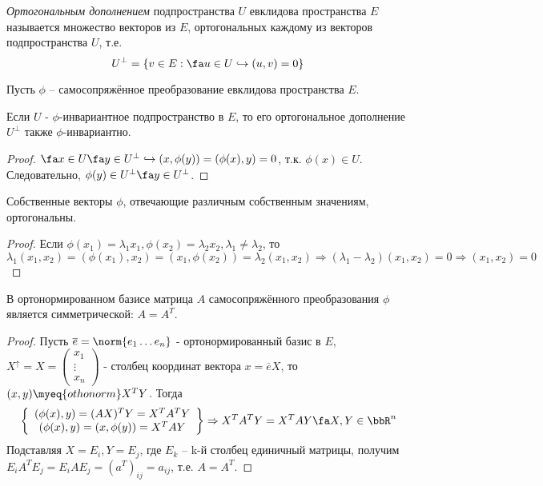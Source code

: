   \begin{defn}
  \textit{Ортогональным дополнением} подпространства $U$ евклидова пространства $E$ называется множество векторов из $E$, ортогональных каждому из векторов подпространства $U$, т.е.
  \begin{equation}\label{23.1.orthogonal}
  U^\perp=\{v \in E: \fa u \in U \hookrightarrow (u,v)=0\}
  \end{equation}
  \end{defn}
  
  Пусть $\phi$ -- самосопряжённое преобразование евклидова \linebreak пространства $E$.
  \begin{stt}\label{23.1.stt_orth}
  Если $U$ - $\phi$-инвариантное подпространство в $E$, то его ортогональное дополнение $U^\perp$ также $\phi$-инвариантно.
  \end{stt}
  \begin{proof}
  $\fa x \in U \fa y \in U^\perp \hookrightarrow (x,\phi(y))=(\phi(x),y)=0$, т.к. $\phi(x)\in U$. Следовательно, $\phi(y)\in U^\perp \fa y\in U^\perp$.
  \end{proof}
  
  \begin{stt}
  Собственные векторы $\phi$, отвечающие различным собственным значениям, ортогональны.
  \end{stt}
  \begin{proof}
  Если $\phi(x_1)=\lambda_1 x_1, \phi(x_2)=\lambda_2 x_2, \lambda_1 \neq \lambda_2$, то $\lambda_1(x_1,x_2)=(\phi(x_1),x_2)=(x_1,\phi(x_2))=\lambda_2(x_1,x_2) \Rightarrow (\lambda_1-\lambda_2)(x_1,x_2)=0 \Rightarrow (x_1,x_2)=0$
  \end{proof}    
  
  \begin{stt}
  В ортонормированном базисе матрица $A$ самосопряжённого преобразования $\phi$ является симметрической: $A=A^T$.
  \end{stt}
  \begin{proof}
  Пусть $\overline{e}=\norm{e_1 \ldots e_n}$ - ортонормированный базис в $E$, $X^\uparrow=X=
  \begin{pmatrix}
  x_1 \\ \vdots \\ x_n
  \end{pmatrix}$ - столбец координат вектора $x=\overline{e}X$, то $(x,y)\myeq{othonorm}X^TY$. Тогда
  \begin{equation*}
  \left\lbrace \begin{array}{crl}
    (\phi(x),y)=(AX)^TY=X^TA^TY \\
    (\phi(x),y)=(x,\phi(y))=X^TAY \\
    \end{array}\right\rbrace \Rightarrow X^TA^TY=X^TAY \fa X,Y\in \bbR^n
  \end{equation*}   
  Подставляя $X=E_i, Y=E_j$, где $E_k$ -- k-й столбец единичный матрицы, получим $E_iA^TE_j=E_iAE_j=(a^T)_{ij}=a_{ij}$, т.е. $A=A^T$.
  \end{proof}
  
